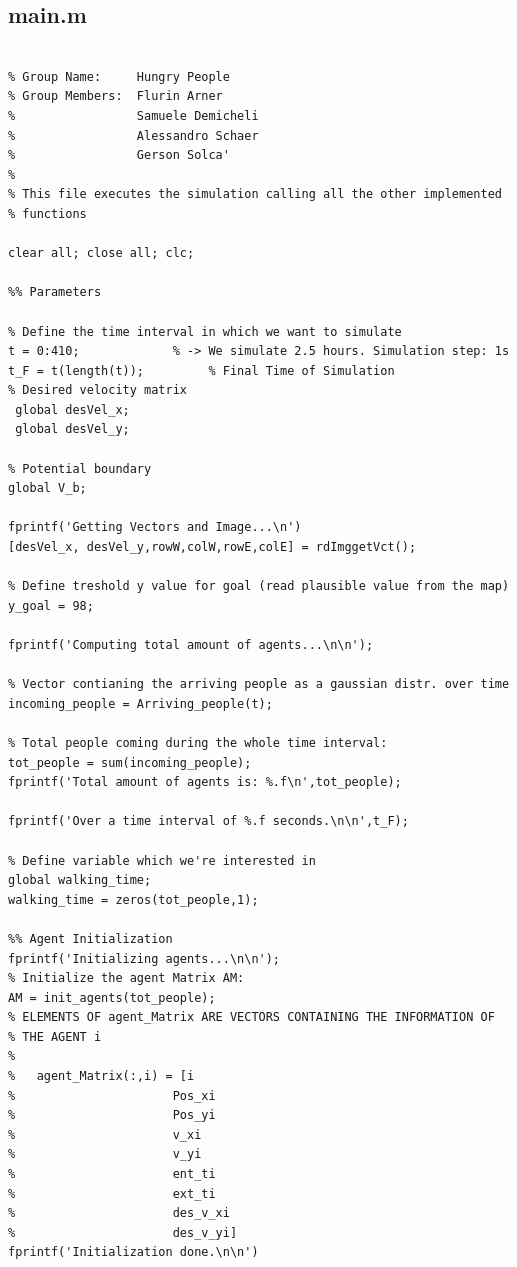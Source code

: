 \documentclass[11pt]{article}
\begin{document}
\subsection*{main.m}

\begin{lstlisting}[frame=lines]
%% Mensa Simulation

% Group Name:     Hungry People
% Group Members:  Flurin Arner
%                 Samuele Demicheli
%                 Alessandro Schaer
%                 Gerson Solca'
%                 
% This file executes the simulation calling all the other implemented 
% functions

clear all; close all; clc;

%% Parameters

% Define the time interval in which we want to simulate
t = 0:410;             % -> We simulate 2.5 hours. Simulation step: 1s
t_F = t(length(t));         % Final Time of Simulation
% Desired velocity matrix
 global desVel_x;
 global desVel_y;
 
% Potential boundary
global V_b;

fprintf('Getting Vectors and Image...\n')
[desVel_x, desVel_y,rowW,colW,rowE,colE] = rdImggetVct();

% Define treshold y value for goal (read plausible value from the map)
y_goal = 98;

fprintf('Computing total amount of agents...\n\n');

% Vector contianing the arriving people as a gaussian distr. over time
incoming_people = Arriving_people(t);

% Total people coming during the whole time interval:
tot_people = sum(incoming_people);
fprintf('Total amount of agents is: %.f\n',tot_people);

fprintf('Over a time interval of %.f seconds.\n\n',t_F);

% Define variable which we're interested in
global walking_time;
walking_time = zeros(tot_people,1);

%% Agent Initialization
fprintf('Initializing agents...\n\n');
% Initialize the agent Matrix AM:
AM = init_agents(tot_people);
% ELEMENTS OF agent_Matrix ARE VECTORS CONTAINING THE INFORMATION OF
% THE AGENT i
%
%   agent_Matrix(:,i) = [i          
%                      Pos_xi
%                      Pos_yi
%                      v_xi
%                      v_yi
%                      ent_ti
%                      ext_ti
%                      des_v_xi
%                      des_v_yi]
fprintf('Initialization done.\n\n')


\end{lstlisting}
\end{document}
